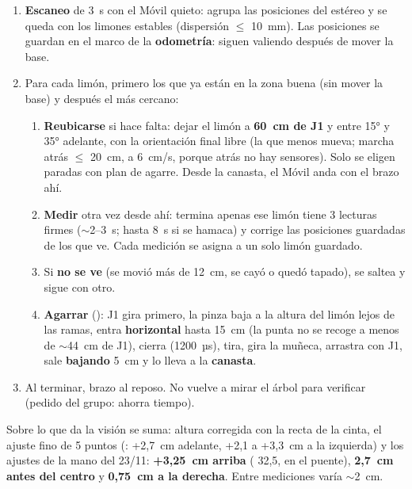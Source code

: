 \begin{enumerate}
  \item \textbf{Escaneo} de 3~s con el Móvil quieto: agrupa las posiciones del estéreo y se queda con los limones
        estables (dispersión $\le$ 10~mm). Las posiciones se guardan en el marco de la \textbf{odometría}: siguen
        valiendo después de mover la base.
  \item Para cada limón, primero los que ya están en la zona buena (sin mover la base) y después el más cercano:
  \begin{enumerate}
    \item \textbf{Reubicarse} si hace falta: dejar el limón a \textbf{60~cm de J1} y entre 15° y 35° adelante, con la
          orientación final libre (la que menos mueva; marcha atrás $\le$ 20~cm, a 6~cm/s, porque atrás no hay
          sensores). Solo se eligen paradas con plan de agarre. Desde la canasta, el Móvil anda con el brazo ahí.
    \item \textbf{Medir} otra vez desde ahí: termina apenas ese limón tiene 3 lecturas firmes ($\sim$2--3~s; hasta
          8~s si se hamaca) y corrige las posiciones guardadas de los que ve. Cada medición se asigna a un solo
          limón guardado.
    \item Si \textbf{no se ve} (se movió más de 12~cm, se cayó o quedó tapado), se saltea y sigue con otro.
    \item \textbf{Agarrar} (): J1 gira primero, la pinza baja a la altura del limón lejos de las ramas,
          entra \textbf{horizontal} hasta 15~cm (la punta no se recoge a menos de $\sim$44~cm de J1), cierra
          (1200~µs), tira, gira la muñeca, arrastra con J1, sale \textbf{bajando} 5~cm y lo lleva a la
          \textbf{canasta}.
  \end{enumerate}
  \item Al terminar, brazo al reposo. No vuelve a mirar el árbol para verificar (pedido del grupo: ahorra tiempo).
\end{enumerate}

\begin{nota}
Sobre lo que da la visión se suma: altura corregida con la recta de la cinta, el ajuste fino de 5 puntos
(: +2,7~cm adelante, +2,1 a +3,3~cm a la izquierda) y
los ajustes de la mano del 23/11: \textbf{+3,25~cm arriba} ( 32,5, en el puente), \textbf{2,7~cm
antes del centro} y \textbf{0,75~cm a la derecha}. Entre mediciones varía $\sim$2~cm.
\end{nota}

